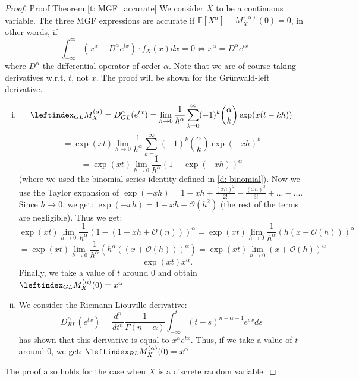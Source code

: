 \begin{proof}
    Proof Theorem \ref{t: MGF_accurate}
    We consider \(X\) to be a continuous variable. The three MGF expressions are accurate if \(\mathbb{E}[X^\alpha] - M_X^{(\alpha)}(0) = 0\), in other words, if 
    \[\int_{-\infty}^{\infty} (x^\alpha - D^\alpha e^{tx}) \cdot f_X(x) dx = 0 \iff x^\alpha = D^\alpha e^{tx}\]
    where \(D^\alpha\) the differential operator of order \(\alpha\). Note that we are of course taking derivatives w.r.t. \(t\), not \(x\). The proof will be shown for the Grünwald-left derivative.
    \begin{enumerate}[(i)]
        \item \[\leftindex_{GL}{M}_X^{(\alpha)} = D^\alpha_{GL}(e^{tx})  = \lim_{h \to 0} \frac{1}{h^\alpha} \sum_{k=0}^\infty (-1)^k \binom{\alpha}{k} \exp(x(t - kh))\]
        \[= \exp(xt) \lim_{h \to 0} \frac{1}{h^\alpha} \sum_{k=0}^\infty (-1)^k \binom{\alpha}{k} \exp(-xh)^k\]
        \[= \exp(xt) \lim_{h \to 0} \frac{1}{h^\alpha} (1 - \exp(-xh))^\alpha\]
        (where we used the binomial series identity defined in \ref{d: binomial}). Now we use the Taylor expansion of \(\exp(-xh) = 1 - xh + \frac{(xh)^2}{2!} - \frac{(xh)^3}{3!} + ... - ...\). Since \(h \to 0\), we get: \(\exp(-xh) = 1 - xh + \mathcal{O}(h^2)\) (the rest of the terms are negligible).
        Thus we get:
        \[ \exp(xt) \lim_{h \to 0} \frac{1}{h^\alpha} (1 -(1 - xh + \mathcal{O}(n)))^\alpha = \exp(xt) \lim_{h \to 0} \frac{1}{h^\alpha} (h(x + \mathcal{O}(h)))^\alpha \]
        \[ = \exp(xt) \lim_{h \to 0} \frac{1}{h^\alpha} (h^\alpha((x + \mathcal{O}(h)))^\alpha) = \exp(xt) \lim_{h \to 0} (x + \mathcal{O}(h))^\alpha\]
        \[ = \exp(xt) x^\alpha.\]
        Finally, we take a value of \(t\) around 0 and obtain \(\leftindex_{GL}{M}_X^{(\alpha)}(0) = x^\alpha\) 
        \item We consider the Riemann-Liouville derivative: 
        \[D_{RL}^\alpha(e^{tx}) = \frac{d^n}{dt^n} \frac{1}{\Gamma(n -\alpha)}  \int_{-\infty}^{t} (t-s)^{n - \alpha-1} e^{sx} ds\]
        \cite{koning15} has shown that this derivative is equal to \(x^\alpha e^{tx}\). Thus, if we take a value of \(t\) around 0, we get: \(\leftindex_{RL}{M}_X^{(\alpha)}(0) = x^\alpha\)
    \end{enumerate}

    The proof also holds for the case when \(X\) is a discrete random variable.
\end{proof}

